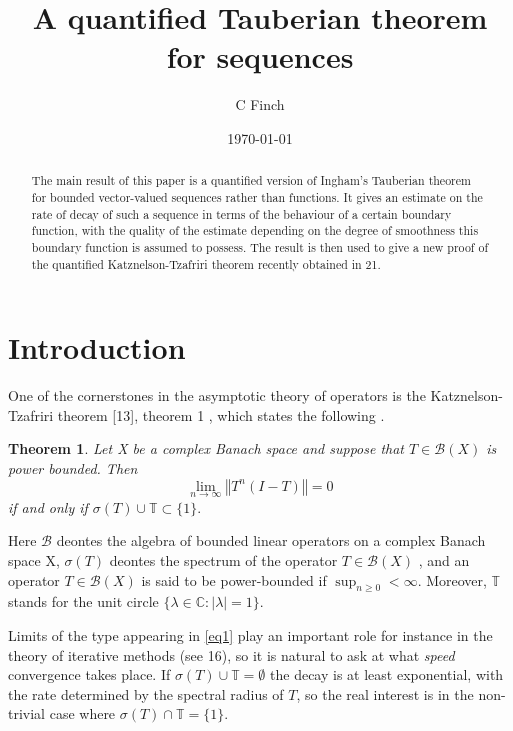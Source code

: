 \documentclass{article}
\newtheorem{thm}{Theorem}  %
\begin{document}
\title{A quantified Tauberian theorem for sequences}
\author{C Finch}
\date{\today}
\maketitle

\begin{abstract}
  The main result of this paper is a quantified version of Ingham's Tauberian theorem for bounded vector-valued sequences rather than functions. It gives an estimate on the rate of decay of such a sequence in terms of the behaviour of a certain boundary function, with the quality of the estimate depending on the degree of smoothness this boundary function is assumed to possess. The result is then used to give a new proof of the quantified Katznelson-Tzafriri theorem recently obtained in 21.   
\end{abstract}


\section{Introduction}
One of the cornerstones in the asymptotic theory of operators is the Katznelson-Tzafriri theorem [13], theorem 1 , which states the following . 

\begin{thm}
  Let X be a complex Banach space and suppose that $T\in \mathcal{B}(X)$ is power bounded. Then 
  \begin{equation} \label{eq1}
    \lim_{n \to \infty} \left\Vert T^n (I-T) \right\Vert =0
  \end{equation}
  if and only if $\sigma(T) \cup \mathbb{T} \subset \{1\}. $
\end{thm}

Here $\mathcal{B}$ deontes the algebra of bounded linear operators on a complex Banach space X, $\sigma(T)$ deontes the spectrum of the operator $T \in \mathcal{B}(X)$ , and an operator $T \in \mathcal{B}(X)$ is said to be power-bounded if $\sup_{n\geq 0}< \infty$. 
Moreover, $\mathbb{T}$ stands for the unit circle $\{\lambda \in \mathbb{C} : |\lambda | =1 \}$.

Limits of the type appearing in \ref{eq1} play an important role for instance in the theory of iterative methods (see 16), so it is natural to ask at what \textit{speed} convergence takes place. 
If $\sigma(T)\cup\mathbb{T}= \emptyset$ the decay is at least exponential, with the rate determined by the spectral radius of $T$, so the real interest is in the non-trivial case where $\sigma(T)\cap\mathbb{T}= \{1\}$.
\end{document}
